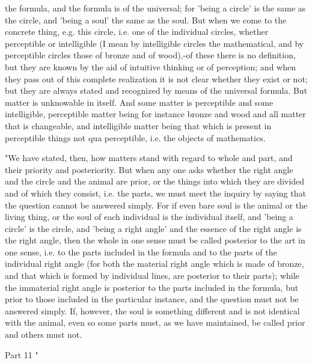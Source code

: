 the formula, and the formula is of the universal; for 'being a circle'
is the same as the circle, and 'being a soul' the same as the soul.
But when we come to the concrete thing, e.g. this circle, i.e. one
of the individual circles, whether perceptible or intelligible (I
mean by intelligible circles the mathematical, and by perceptible
circles those of bronze and of wood),-of these there is no definition,
but they are known by the aid of intuitive thinking or of perception;
and when they pass out of this complete realization it is not clear
whether they exist or not; but they are always stated and recognized
by means of the universal formula. But matter is unknowable in itself.
And some matter is perceptible and some intelligible, perceptible
matter being for instance bronze and wood and all matter that is changeable,
and intelligible matter being that which is present in perceptible
things not qua perceptible, i.e. the objects of mathematics.

"We have stated, then, how matters stand with regard to whole and
part, and their priority and posteriority. But when any one asks whether
the right angle and the circle and the animal are prior, or the things
into which they are divided and of which they consist, i.e. the parts,
we must meet the inquiry by saying that the question cannot be answered
simply. For if even bare soul is the animal or the living thing, or
the soul of each individual is the individual itself, and 'being a
circle' is the circle, and 'being a right angle' and the essence of
the right angle is the right angle, then the whole in one sense must
be called posterior to the art in one sense, i.e. to the parts included
in the formula and to the parts of the individual right angle (for
both the material right angle which is made of bronze, and that which
is formed by individual lines, are posterior to their parts); while
the immaterial right angle is posterior to the parts included in the
formula, but prior to those included in the particular instance, and
the question must not be answered simply. If, however, the soul is
something different and is not identical with the animal, even so
some parts must, as we have maintained, be called prior and others
must not. 

Part 11 "

